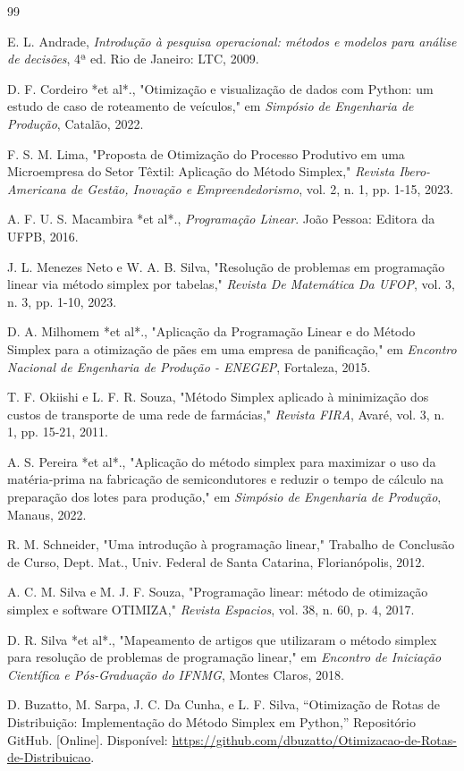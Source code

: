 \documentclass[conference]{IEEEtran}
\begin{document}
\begin{thebibliography}{99}

E. L. Andrade, \textit{Introdução à pesquisa operacional: métodos e modelos para análise de decisões}, 4ª ed. Rio de Janeiro: LTC, 2009.


D. F. Cordeiro *et al*., "Otimização e visualização de dados com Python: um estudo de caso de roteamento de veículos," em \textit{Simpósio de Engenharia de Produção}, Catalão, 2022.

F. S. M. Lima, "Proposta de Otimização do Processo Produtivo em uma Microempresa do Setor Têxtil: Aplicação do Método Simplex," \textit{Revista Ibero-Americana de Gestão, Inovação e Empreendedorismo}, vol. 2, n. 1, pp. 1-15, 2023.

A. F. U. S. Macambira *et al*., \textit{Programação Linear}. João Pessoa: Editora da UFPB, 2016.

J. L. Menezes Neto e W. A. B. Silva, "Resolução de problemas em programação linear via método simplex por tabelas," \textit{Revista De Matemática Da UFOP}, vol. 3, n. 3, pp. 1-10, 2023.

D. A. Milhomem *et al*., "Aplicação da Programação Linear e do Método Simplex para a otimização de pães em uma empresa de panificação," em \textit{Encontro Nacional de Engenharia de Produção - ENEGEP}, Fortaleza, 2015.

T. F. Okiishi e L. F. R. Souza, "Método Simplex aplicado à minimização dos custos de transporte de uma rede de farmácias," \textit{Revista FIRA}, Avaré, vol. 3, n. 1, pp. 15-21, 2011.

A. S. Pereira *et al*., "Aplicação do método simplex para maximizar o uso da matéria-prima na fabricação de semicondutores e reduzir o tempo de cálculo na preparação dos lotes para produção," em \textit{Simpósio de Engenharia de Produção}, Manaus, 2022.

R. M. Schneider, "Uma introdução à programação linear," Trabalho de Conclusão de Curso, Dept. Mat., Univ. Federal de Santa Catarina, Florianópolis, 2012.

A. C. M. Silva e M. J. F. Souza, "Programação linear: método de otimização simplex e software OTIMIZA," \textit{Revista Espacios}, vol. 38, n. 60, p. 4, 2017.

D. R. Silva *et al*., "Mapeamento de artigos que utilizaram o método simplex para resolução de problemas de programação linear," em \textit{Encontro de Iniciação Científica e Pós-Graduação do IFNMG}, Montes Claros, 2018.

D. Buzatto, M. Sarpa, J. C. Da Cunha, e L. F. Silva, ``Otimização de Rotas de Distribuição: Implementação do Método Simplex em Python,'' Repositório GitHub. [Online]. Disponível: \url{https://github.com/dbuzatto/Otimizacao-de-Rotas-de-Distribuicao}.


\end{thebibliography}
\end{document}
